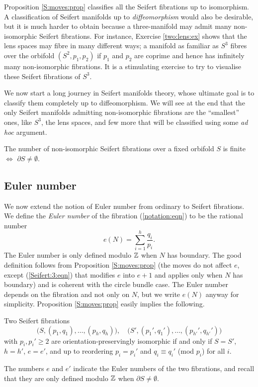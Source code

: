 Proposition \ref{S:moves:prop} classifies all the Seifert fibrations up to isomorphism. A classification of Seifert manifolds up to \emph{diffeomorphism} would also be desirable, but it is much harder to obtain because a three-manifold may admit many non-isomorphic Seifert fibrations. For instance, 
Exercise \ref{two:lens:ex} shows that the lens spaces may fibre in many different ways; a manifold as familiar as $S^3$ fibres over the orbifold $(S^2, p_1, p_2)$ if $p_1$ and $p_2$ are coprime and hence has infinitely many non-isomorphic fibrations. It is a stimulating exercise to try to visualise these Seifert fibrations of $S^3$.

We now start a long journey in Seifert manifolds theory, whose ultimate goal is to classify them completely up to diffeomorphism. We will see at the end that the only Seifert manifolds admitting non-isomorphic fibrations are the ``smallest'' ones, like $S^3$, the lens spaces, and few more that will be classified using some \emph{ad hoc} argument.

\begin{ex}
The number of non-isomorphic Seifert fibrations over a fixed orbifold $S$ is finite $\Longleftrightarrow$ $\partial S \neq \emptyset$.
\end{ex}

\subsection{Euler number}
We now extend the notion of Euler number from ordinary to Seifert fibrations.
We define the \emph{Euler number} of the fibration (\ref{notation:eqn}) to be the rational number
$$e(N) = \sum_{i=1}^h \frac{q_i}{p_i}.$$
The Euler number is only defined modulo $\mathbb{Z}$ when $N$ has boundary. The good definition follows from Proposition \ref{S:moves:prop} (the moves do not affect $e$, except (\ref{Seifert:3:eqn}) that modifies $e$ into $e+1$ and applies only when $N$ has boundary) and is coherent with the circle bundle case. The Euler number depends on the fibration and not only on $N$, but we write $e(N)$ anyway for simplicity. Proposition \ref{S:moves:prop} easily implies the following.

\begin{cor} \label{classification:Seifert:cor}
Two Seifert fibrations
$$\big(S, (p_1,q_1), \ldots, (p_h, q_h)\big), \quad \big(S', (p_1',q_1'), \ldots, (p_{h'}', q_{h'}')\big)$$
with $p_i, p_i'\geqslant 2$ are orientation-preservingly isomorphic if and only if $S=S'$, $h=h'$, $e=e'$, and up to reordering $p_i=p_i'$ and $q_i \equiv q_i'$ (mod $p_i$) for all $i$.
\end{cor}
The numbers $e$ and $e'$ indicate the Euler numbers of the two fibrations, and recall that they are only defined modulo $\mathbb{Z}$ when $\partial S \neq \emptyset$.


